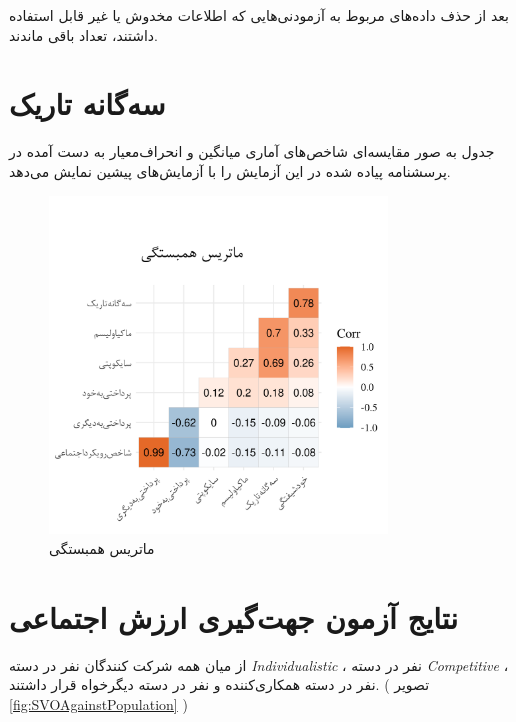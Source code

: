 بعد از حذف داده‌های مربوط به آزمودنی‌هایی که اطلاعات مخدوش یا غیر قابل استفاده داشتند، تعداد
\CleanedSampleSize
باقی ماندند.

\section{سه‌گانه تاریک}
جدول
\CompareDarkTriadStatisticsRef
به صور مقایسه‌ای
شاخص‌های آماری میانگین و انحراف‌معیار به دست آمده در پرسشنامه پیاده شده در این آزمایش
را با آزمایش‌های پیشین نمایش می‌دهد.

\CompareDarkTriadStatisticsCustomTableCommand


\LatexFromStatisticsRankMeansCommand
% 
\begin{figure}[htpb]
    \centering
    \includegraphics[width=0.8\textwidth]{./img/CorrPlotIntervals.png}
    \caption{ماتریس همبستگی}
    \label{fig:CorrPlotIntervals}
\end{figure}

\section{نتایج آزمون جهت‌گیری ارزش اجتماعی}
از میان همه شرکت کنندگان
\noOfIndividualisticParticipants
نفر در دسته
\textit{
    \gls{Individualistic}
}
،
\noOfCompetitiveParticipants
نفر در دسته
\textit{
    \gls{Competitive}
}
،
\noOfCooperativeParticipants
نفر در دسته
همکاری‌کننده
و
\noOfAltruisticParticipants
نفر در دسته
دیگر‌خواه
قرار داشتند.
(
تصویر \ref{fig:SVOAgainstPopulation}
)

